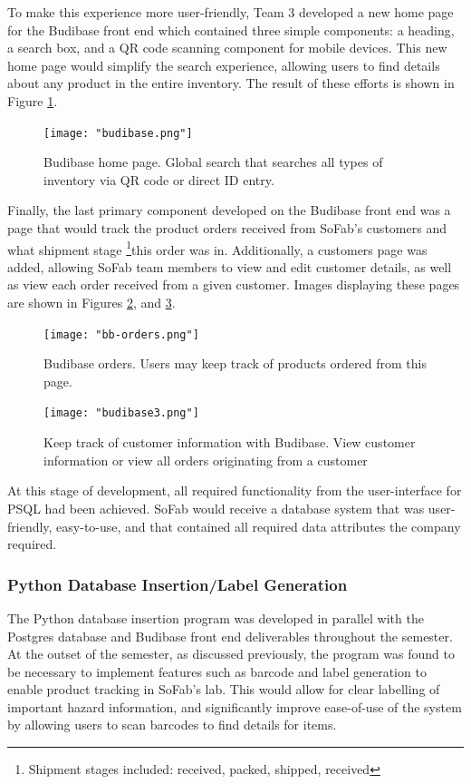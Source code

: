 \documentclass{article}
\begin{document}
To make this experience more user-friendly, Team 3 developed a new 
home page for the Budibase front end which contained three simple components: a heading, a search box, and a QR code scanning component
for mobile devices. This new home page would simplify the search experience, allowing users to find details about any product in the 
entire inventory. The result of these efforts is shown in Figure \ref{fig:budibase_home}.

 \begin{figure}[h!]
    \centering
    \texttt{[image: "budibase.png"]}
    \caption{Budibase home page. Global search that searches all types of inventory via QR code or direct ID entry.}
    \label{fig:budibase_home}
\end{figure}

Finally, the last primary component developed on the Budibase front end was a page that would track the product orders received from 
SoFab's customers and what shipment stage \footnote{Shipment stages included: received, packed, shipped, received}this order was in.
Additionally, a customers page was added, allowing SoFab team members to view and edit customer details, as well as view each order 
received from a given customer. Images displaying these pages are shown in Figures \ref{fig:bb-orders}, and \ref{fig:budibase_customers}.

\begin{figure}[h!]
    \centering
    \texttt{[image: "bb-orders.png"]}
    \caption{Budibase orders. Users may keep track of products ordered from this page.}
    \label{fig:bb-orders}
\end{figure}
\begin{figure}[h!]
    \centering
    \texttt{[image: "budibase3.png"]}
    \caption{Keep track of customer information with Budibase. View customer information or view all orders originating from a
    customer}
    \label{fig:budibase_customers}
\end{figure}

\FloatBarrier
\clearpage

At this stage of development, all required functionality from the user-interface for PSQL had been achieved. SoFab would receive a 
database system that was user-friendly, easy-to-use, and that contained all required data attributes the company required. 

\subsubsection{Python Database Insertion\slash Label Generation}
The Python database insertion program was developed in parallel with the Postgres database and Budibase front end deliverables throughout 
the semester. At the outset of the semester, as discussed previously, the program was found to be necessary to implement features such
as barcode and label generation to enable product tracking in SoFab's lab. This would allow for clear labelling of important hazard 
information, and significantly improve ease-of-use of the system by allowing users to scan barcodes to find details for items.
\end{document}
